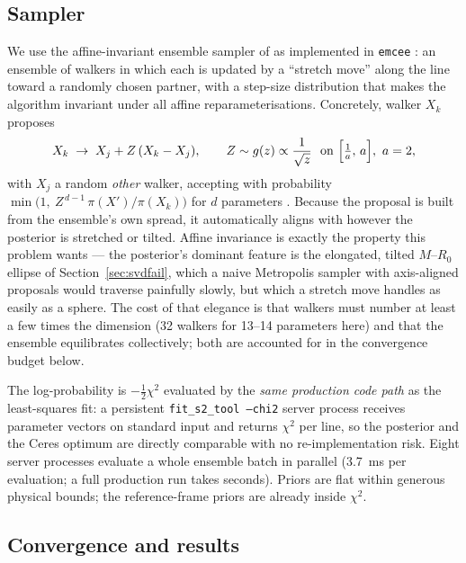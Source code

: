 \subsection{Sampler}

We use the affine-invariant ensemble sampler of
\citet{GoodmanWeare2010} as implemented in \texttt{emcee}
\citep{ForemanMackey2013}: an ensemble of walkers in which each is
updated by a ``stretch move'' along the line toward a randomly chosen
partner, with a step-size distribution that makes the algorithm
invariant under all affine reparameterisations. Concretely, walker
$X_k$ proposes
\begin{equation}
X_k \;\rightarrow\; X_j + Z\,(X_k - X_j),
\qquad
Z \sim g(z) \propto \frac{1}{\sqrt z}\ \hbox{ on }
\Bigl[\tfrac1a,\, a\Bigr],\ a = 2,
\label{eq:stretch}
\end{equation}
with $X_j$ a random \emph{other} walker, accepting with probability
$\min\bigl(1,\ Z^{\,d-1}\,\pi(X')/\pi(X_k)\bigr)$ for $d$ parameters
\citep{GoodmanWeare2010}. Because the proposal is built from the
ensemble's own spread, it automatically aligns with however the
posterior is stretched or tilted. Affine invariance is
exactly the property this problem wants — the posterior's dominant
feature is the elongated, tilted $M$--$R_0$ ellipse of
Section~\ref{sec:svdfail}, which a naive Metropolis sampler with
axis-aligned proposals would traverse painfully slowly, but which a
stretch move handles as easily as a sphere. The cost of that elegance
is that walkers must number at least a few times the dimension (32
walkers for 13--14 parameters here) and that the ensemble equilibrates
collectively; both are accounted for in the convergence budget below.

The log-probability is $-\tfrac12\chi^2$ evaluated by the \emph{same
production code path} as the least-squares fit: a persistent
\texttt{fit\_s2\_tool --chi2} server process receives parameter vectors
on standard input and returns $\chi^2$ per line, so the posterior and
the Ceres optimum are directly comparable with no re-implementation
risk. Eight server processes evaluate a whole ensemble batch in
parallel (3.7~ms per evaluation; a full production run takes seconds).
Priors are flat within generous physical bounds; the
\citet{Plewa2015} reference-frame priors are already inside $\chi^2$.

\subsection{Convergence and results}


